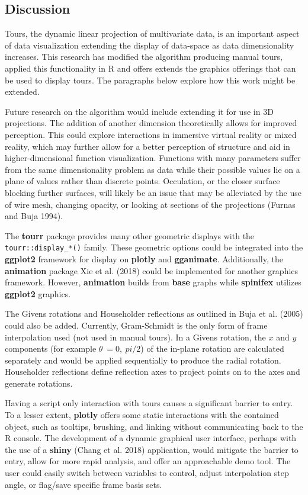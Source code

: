 \hypertarget{sec:discussion}{%
\subsection{Discussion}\label{sec:discussion}}

Tours, the dynamic linear projection of multivariate data, is an important aspect of data visualization extending the display of data-space as data dimensionality increases. This research has modified the algorithm producing manual tours, applied this functionality in R and offers extends the graphics offerings that can be used to display tours. The paragraphs below explore how this work might be extended.

Future research on the algorithm would include extending it for use in 3D projections. The addition of another dimension theoretically allows for improved perception. This could explore interactions in immersive virtual reality or mixed reality, which may further allow for a better perception of structure and aid in higher-dimensional function visualization. Functions with many parameters suffer from the same dimensionality problem as data while their possible values lie on a plane of values rather than discrete points. Occulation, or the closer surface blocking further surfaces, will likely be an issue that may be alleviated by the use of wire mesh, changing opacity, or looking at sections of the projections (Furnas and Buja 1994).

The \textbf{tourr} package provides many other geometric displays with the \texttt{tourr::display\_*()} family. These geometric options could be integrated into the \textbf{ggplot2} framework for display on \textbf{plotly} and \textbf{gganimate}. Additionally, the \textbf{animation} package Xie et al. (2018) could be implemented for another graphics framework. However, \textbf{animation} builds from \textbf{base} graphs while \textbf{spinifex} utilizes \textbf{ggplot2} graphics.

The Givens rotations and Householder reflections as outlined in Buja et al. (2005) could also be added. Currently, Gram-Schmidt is the only form of frame interpolation used (not used in manual tours). In a Givens rotation, the \(x\) and \(y\) components (for example \(\theta~= 0,~pi/2\)) of the in-plane rotation are calculated separately and would be applied sequentially to produce the radial rotation. Householder reflections define reflection axes to project points on to the axes and generate rotations.

Having a script only interaction with tours causes a significant barrier to entry. To a lesser extent, \textbf{plotly} offers some static interactions with the contained object, such as tooltips, brushing, and linking without communicating back to the R console. The development of a dynamic graphical user interface, perhaps with the use of a \textbf{shiny} (Chang et al. 2018) application, would mitigate the barrier to entry, allow for more rapid analysis, and offer an approachable demo tool. The user could easily switch between variables to control, adjust interpolation step angle, or flag/save specific frame basis sets.

